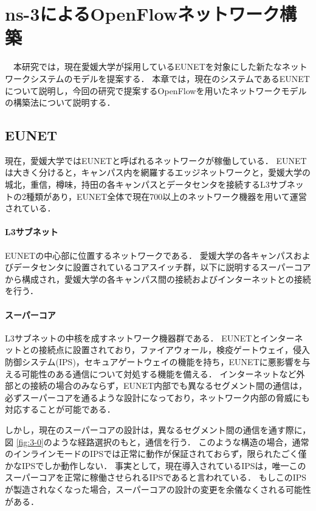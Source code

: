 \chapter{ns-3によるOpenFlowネットワーク構築}

　本研究では，現在愛媛大学が採用しているEUNETを対象にした新たなネットワークシステムのモデルを提案する．
本章では，現在のシステムであるEUNETについて説明し，今回の研究で提案するOpenFlowを用いたネットワークモデルの構築法について説明する．

\section{EUNET}

現在，愛媛大学ではEUNETと呼ばれるネットワークが稼働している．
EUNETは大きく分けると，キャンパス内を網羅するエッジネットワークと，愛媛大学の城北，重信，樽味，持田の各キャンパスとデータセンタを接続するL3サブネットの2種類があり，EUNET全体で現在700以上のネットワーク機器を用いて運営されている．

\subsubsection{L3サブネット}

EUNETの中心部に位置するネットワークである．
愛媛大学の各キャンパスおよびデータセンタに設置されているコアスイッチ群，以下に説明するスーパーコアから構成され，愛媛大学の各キャンパス間の接続およびインターネットとの接続を行う．

\subsubsection{スーパーコア}

L3サブネットの中核を成すネットワーク機器群である．
EUNETとインターネットとの接続点に設置されており，ファイアウォール，検疫ゲートウェイ，侵入防御システム(IPS)，セキュアゲートウェイの機能を持ち，EUNETに悪影響を与える可能性のある通信について対処する機能を備える．
インターネットなど外部との接続の場合のみならず，EUNET内部でも異なるセグメント間の通信は，必ずスーパーコアを通るような設計になっており，ネットワーク内部の脅威にも対応することが可能である．

しかし，現在のスーパーコアの設計は，異なるセグメント間の通信を通す際に，図 \ref{fig:3-0}のような経路選択のもと，通信を行う．
このような構造の場合，通常のインラインモードのIPSでは正常に動作が保証されておらず，限られたごく僅かなIPSでしか動作しない．
事実として，現在導入されているIPSは，唯一このスーパーコアを正常に稼働させられるIPSであると言われている．
もしこのIPSが製造されなくなった場合，スーパーコアの設計の変更を余儀なくされる可能性がある．

